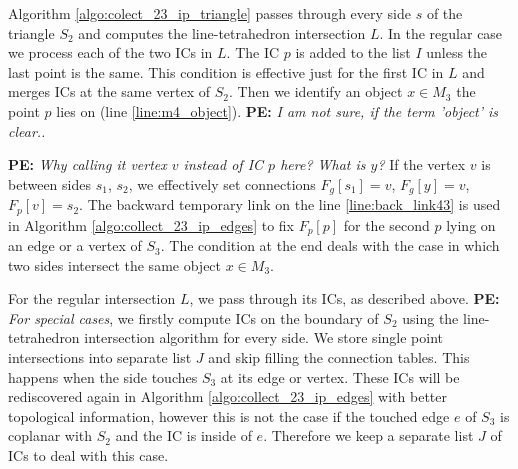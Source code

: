 \documentclass{elsarticle}
\newcommand{\notePE}[1]{{\color{Orange} \textbf{PE: } \textit{#1}}}
\begin{document}
Algorithm \ref{algo:colect_23_ip_triangle} passes through every side $s$ of the triangle $S_2$ and computes the line-tetrahedron intersection $L$.
In the regular case we process each of the two ICs in $L$. The IC $p$ is added to the list $I$ unless the last point is the same. 
This condition is effective just for the first IC in $L$ and merges ICs at the same vertex of $S_2$. Then we identify an object $x\in M_3$ the point
$p$ lies on (line \ref{line:m4_object}). \notePE{I am not sure, if the term 'object' is clear..}

\notePE{Why calling it vertex $v$ instead of IC $p$ here? What is $y$?}
If the vertex $v$ is between sides $s_1$, $s_2$, 
we effectively set connections $F_g[s_1] = v$, $F_g[y]=v$, $F_p[v] = s_2$. The backward temporary link on the line \ref{line:back_link43} 
is used in Algorithm \ref{algo:collect_23_ip_edges} to fix $F_p[p]$ for the second $p$ lying on an edge or a vertex of $S_3$. The condition at the end deals with the case
in which two sides intersect the same object $x\in M_3$.


For the regular intersection $L$, we pass through its ICs, as described above. \notePE{For special cases}, we firstly compute ICs
on the boundary of $S_2$ using the line-tetrahedron intersection algorithm for every side. We store single point intersections into separate list $J$
and skip filling the connection tables. This happens when the side touches $S_3$ at its edge or vertex. 
These ICs will be rediscovered again in Algorithm \ref{algo:collect_23_ip_edges} with better topological information, however
this is not the case if the touched edge $e$ of $S_3$ is coplanar with $S_2$ and the IC is inside of $e$. 
Therefore we keep a separate list $J$ of ICs to deal with this case.
\end{document}
